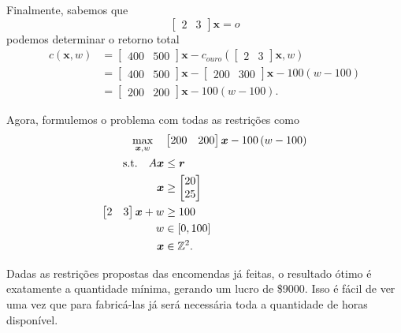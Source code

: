 \documentclass[a4paper]{report}
\begin{document}
Finalmente, sabemos que \[
	\begin{bmatrix} 2 & 3 \end{bmatrix} \bm{x} = o
\]  podemos determinar o retorno total
\begin{align*}
    c\left( \bm{x}, w \right) &= \begin{bmatrix} 400 & 500 \end{bmatrix} \bm{x} - c_{ouro}\left(  \begin{bmatrix} 2 & 3 \end{bmatrix} \bm{x}, w  \right)  \\
    &= \begin{bmatrix} 400 & 500 \end{bmatrix} \bm{x} -\begin{bmatrix} 200 & 300 \end{bmatrix} \bm{x} - 100 \left( w-100 \right)  \\
    &= \begin{bmatrix} 200 & 200 \end{bmatrix} \bm{x} - 100\left( w-100 \right) 
.\end{align*}

Agora, formulemos o problema com todas as restrições como
\begin{align*}
    \max_{\bm{x}, w} \quad & \begin{bmatrix} 200 & 200 \end{bmatrix} \bm{x} -100\left( w-100 \right)  \\
    \textrm{s.t.} \quad A\bm{x} &\le \bm{r} \\
    \bm{x} &\ge \begin{bmatrix} 20 \\ 25 \end{bmatrix} \\
			\begin{bmatrix} 2 & 3 \end{bmatrix} \bm{x} + w &\ge 100 \\
			w &\in \left[ 0, 100 \right] \\
			\bm{x} &\in \mathbb{Z}^2
.\end{align*}

Dadas as restrições propostas das encomendas já feitas, o resultado ótimo é exatamente a quantidade mínima, gerando um lucro de \$9000. Isso é fácil de ver uma vez que para fabricá-las já será necessária toda a quantidade de horas disponível.


\end{document}
